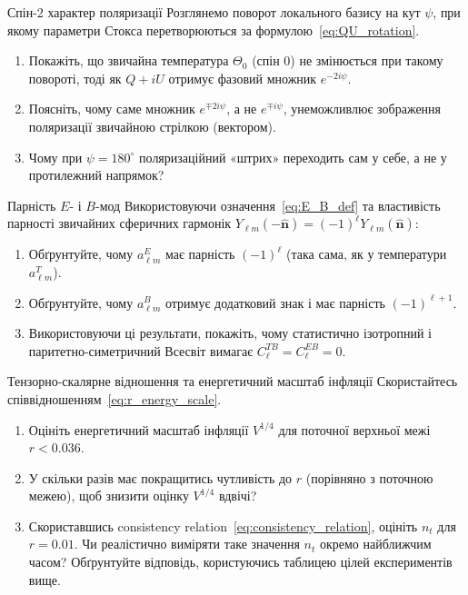 \begin{problem}{Спін-2 характер поляризації}
Розглянемо поворот локального базису на кут $\psi$, при якому
параметри Стокса перетворюються за формулою~\eqref{eq:QU_rotation}.
\begin{enumerate}
    \item Покажіть, що звичайна температура $\Theta_0$ (спін $0$)
          не змінюється при такому повороті, тоді як $Q+iU$ отримує
          фазовий множник $e^{-2i\psi}$.
    \item Поясніть, чому саме множник $e^{\mp 2i\psi}$, а не
          $e^{\mp i\psi}$, унеможливлює зображення поляризації
          звичайною стрілкою (вектором).
    \item Чому при $\psi = 180^\circ$ поляризаційний «штрих» переходить
          сам у себе, а не у протилежний напрямок?
\end{enumerate}
\end{problem}


\begin{problem}{Парність $E$- і $B$-мод}
Використовуючи означення~\eqref{eq:E_B_def} та властивість парності
звичайних сферичних гармонік $Y_{\ell m}(-\hat{\mathbf n}) = (-1)^\ell
Y_{\ell m}(\hat{\mathbf n})$:
\begin{enumerate}
    \item Обґрунтуйте, чому $a_{\ell m}^E$ має парність $(-1)^\ell$
          (така сама, як у температури $a_{\ell m}^T$).
    \item Обґрунтуйте, чому $a_{\ell m}^B$ отримує додатковий знак
          і має парність $(-1)^{\ell+1}$.
    \item Використовуючи ці результати, покажіть, чому статистично
          ізотропний і паритетно-симетричний Всесвіт вимагає
          $C_\ell^{TB} = C_\ell^{EB} = 0$.
\end{enumerate}
\end{problem}


\begin{problem}{Тензорно-скалярне відношення та енергетичний масштаб інфляції}
Скористайтесь співвідношенням~\eqref{eq:r_energy_scale}.
\begin{enumerate}
    \item Оцініть енергетичний масштаб інфляції $V^{1/4}$ для
          поточної верхньої межі $r < 0.036$.
    \item У скільки разів має покращитись чутливість до $r$
          (порівняно з поточною межею), щоб знизити оцінку $V^{1/4}$
          вдвічі?
    \item Скориставшись consistency relation~\eqref{eq:consistency_relation},
          оцініть $n_t$ для $r = 0.01$. Чи реалістично виміряти таке
          значення $n_t$ окремо найближчим часом? Обґрунтуйте відповідь,
          користуючись таблицею цілей експериментів вище.
\end{enumerate}
\end{problem}

